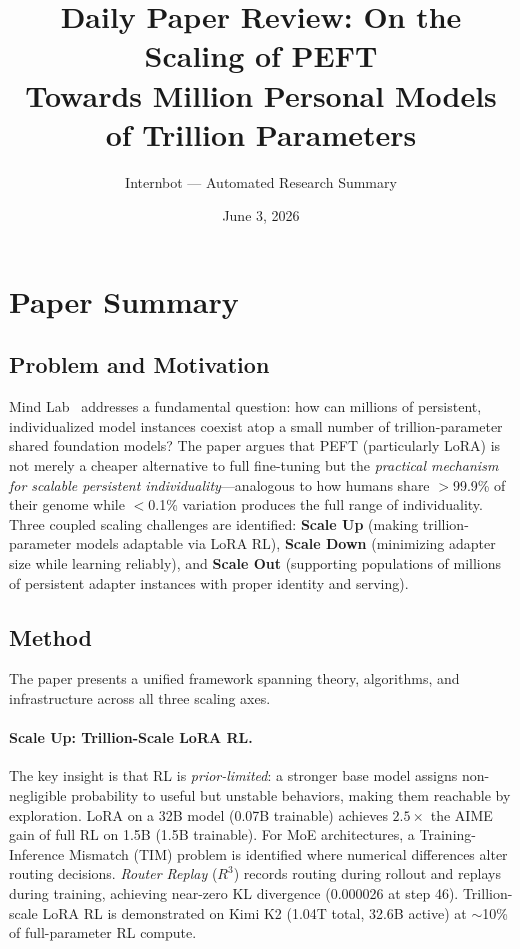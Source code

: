 \documentclass[11pt,a4paper]{article}
\title{Daily Paper Review: On the Scaling of PEFT\\Towards Million Personal Models of Trillion Parameters}
\author{Internbot --- Automated Research Summary}
\date{June 3, 2026}
\begin{document}
\maketitle

\section{Paper Summary}

\subsection{Problem and Motivation}

Mind Lab~\cite{mindlab2026peft} addresses a fundamental question: how can millions of persistent, individualized model instances coexist atop a small number of trillion-parameter shared foundation models? The paper argues that PEFT (particularly LoRA) is not merely a cheaper alternative to full fine-tuning but the \emph{practical mechanism for scalable persistent individuality}---analogous to how humans share $>$99.9\% of their genome while $<$0.1\% variation produces the full range of individuality. Three coupled scaling challenges are identified: \textbf{Scale Up} (making trillion-parameter models adaptable via LoRA RL), \textbf{Scale Down} (minimizing adapter size while learning reliably), and \textbf{Scale Out} (supporting populations of millions of persistent adapter instances with proper identity and serving).

\subsection{Method}

The paper presents a unified framework spanning theory, algorithms, and infrastructure across all three scaling axes.

\paragraph{Scale Up: Trillion-Scale LoRA RL.} The key insight is that RL is \emph{prior-limited}: a stronger base model assigns non-negligible probability to useful but unstable behaviors, making them reachable by exploration. LoRA on a 32B model (0.07B trainable) achieves $2.5\times$ the AIME gain of full RL on 1.5B (1.5B trainable). For MoE architectures, a Training-Inference Mismatch (TIM) problem is identified where numerical differences alter routing decisions. \emph{Router Replay} ($R^3$) records routing during rollout and replays during training, achieving near-zero KL divergence (0.000026 at step 46). Trillion-scale LoRA RL is demonstrated on Kimi K2 (1.04T total, 32.6B active) at $\sim$10\% of full-parameter RL compute.
\end{document}
